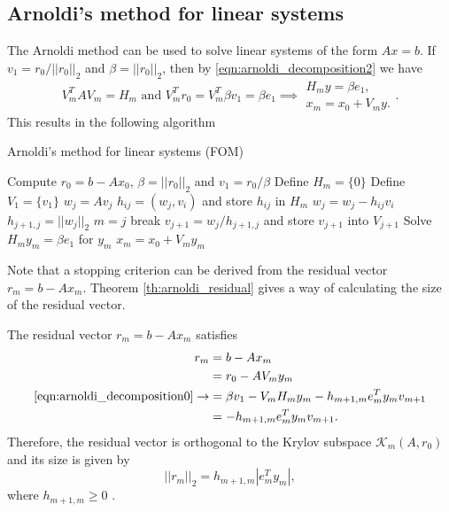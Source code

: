 \subsection{Arnoldi's method for linear systems}\label{sec:arnoldi_linear_systems}
The Arnoldi method can be used to solve linear systems of the form $Ax = b$. If $v_1 = r_0/||r_0||_2$ and $\beta = ||r_0||_2$, then by \cref{eqn:arnoldi_decomposition2} we have
\[
  V^T_mAV_m = H_m \text{ and } V^T_mr_0 = V^T_m\beta v_1 = \beta e_1 \implies \begin{array}{c}
    H_m y = \beta e_1, \\
    x_m = x_0 + V_m y.
  \end{array} .
\]
This results in the following algorithm
\begin{algorithm}[H]
  \caption{Arnoldi's method for linear systems (FOM) \cite[Algorithm 6.4]{iter_method_saad}}
  \label{alg:arnoldi_linear_systems}
  \begin{algorithmic}
    \State Compute $r_0 = b - Ax_0$, $\beta = ||r_0||_2$ and $v_1 = r_0 / \beta$
    \State Define $H_m = \{0\}$
    \State Define $V_1 = \{v_1\}$
    \State $w_j = Av_j$
    \State $h_{ij} = (w_j, v_i)$ and store $h_{ij}$ in $H_m$
    \State $w_j = w_j - h_{ij}v_i$
    \EndFor
    \State $h_{j+1,j} = ||w_j||_2$
    \State $m = j$
    \State break
    \EndIf
    \State $v_{j+1} = w_j / h_{j+1,j}$ and store $v_{j+1}$ into $V_{j+1}$
    \EndFor
    \State Solve $H_m y_m = \beta e_1$ for $y_m$
    \State $x_m = x_0 + V_m y_m$
  \end{algorithmic}
\end{algorithm}

Note that a stopping criterion can be derived from the residual vector $r_m = b - Ax_m$. Theorem \ref{th:arnoldi_residual} gives a way of calculating the size of the residual vector.
\begin{theorem}
  The residual vector $r_m = b - Ax_m$ satisfies
  \begin{subequations}
    \begin{align}
      r_m                                          & = b - Ax_m                                                  \\
                                                   & = r_0 - AV_m y_m                                            \\
      \cref{eqn:arnoldi_decomposition0}\rightarrow & = \beta v_1 - V_m H_m y_m - h_{m+1,m} e_m^T y_m v_{m+1}     \\
                                                   & = - h_{m+1,m} e_m^T y_m v_{m+1}.\label{eq:arnoldi_residual}
    \end{align}
  \end{subequations}
  Therefore, the residual vector is orthogonal to the Krylov subspace $\mathcal{K}_m(A, r_0)$ and its size is given by
  \begin{equation}
    ||r_m||_2 = h_{m+1,m}|e^T_m y_m|,
    \label{eq:arnoldi_residual_size}
  \end{equation}
  where $h_{m+1,m}\geq 0$ \cite[Proposition 6.7]{iter_method_saad}.
  \label{th:arnoldi_residual}
\end{theorem}

